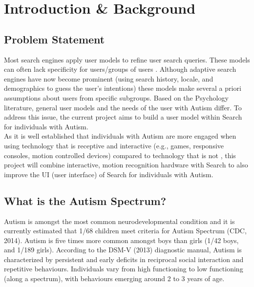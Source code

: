 \documentclass[a4paper, 11pt]{article}
\begin{document}
\tableofcontents
\clearpage

\section{Introduction \& Background}
\subsection{Problem Statement} \label{prob}
Most search engines apply user models to refine user search queries. These models can often lack specificity for users/groups of users \cite{usermodel}. Although adaptive search engines have now become prominent (using search history, locale, and demographics to guess the user's intentions) these models make several a priori assumptions about users from specific subgroups. Based on the Psychology literature, general user models and the needs of the user with Autism differ. To address this issue, the current project aims to build a user model within Search for individuals with Autism.\\
As it is well established that individuals with Autism are more engaged when using technology that is receptive and interactive (e.g., games, responsive consoles, motion controlled devices) compared to technology that is not \cite{motioncontrollerforautism}, this project will combine interactive, motion recognition hardware with Search to also improve the UI (user interface) of Search for individuals with Autism.

\subsection{What is the Autism Spectrum?}
Autism is amongst the most common neurodevelopmental condition and it is currently estimated that 1/68 children meet criteria for Autism Spectrum (CDC, 2014). Autism is five times more common amongst boys than girls (1/42 boys, and 1/189 girls). According to the DSM-V (2013) diagnostic manual, Autism is characterized by persistent and early deficits in reciprocal social interaction and repetitive behaviours. Individuals vary from high functioning to low functioning (along a spectrum), with behaviours emerging around 2 to 3 years of age. 
\end{document}

